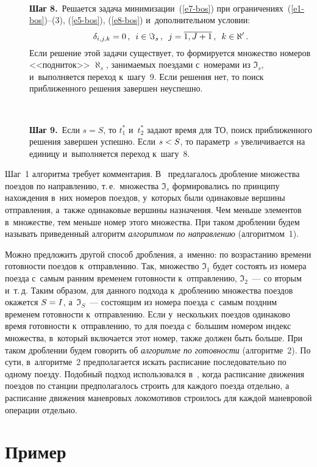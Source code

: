 \begin{multicols}{2}
\begin{description}
      
\item [\,] 
\textbf{Шаг 8.}\ Решается задача минимизации~(\ref{e7-bos}) при  
ограничениях~(\ref{e1-bos})--(3), (\ref{e5-bos}), (\ref{e8-bos}) и~дополнительном 
условии:
$$
\delta_{i,j,k}=0\,,\enskip i\in \Im_s\,,\enskip j=\overline{1,J+1}\,, \enskip k\in 
\aleph^\prime\,.
$$
Если решение этой задачи существует, то формируется множество номеров 
<<подниток>> $\aleph_s$, занимаемых поездами с~номерами из $\Im_s$, 
и~выполняется переход к~шагу~9. Если решения нет, то поиск приближенного 
решения завершен неуспешно.
\item [\,] 
\textbf{Шаг 9.}\ Если $s=S$, то $t_1^*$ и~$t_2^*$ задают время для ТО, поиск 
приближенного решения завершен успешно. Если $s\hm< S$, то параметр~$s$ 
увеличивается на единицу и~выполняется переход к~шагу~8.
\end{description}
  
  Шаг~1 алгоритма требует комментария. В~\cite{7-bos} предлагалось дробление 
множества поездов по направлению, т.\,е.\ множества $\Im_s$ формировались по 
принципу нахождения в~них номеров поездов, у~которых были одинаковые 
вершины отправления, а~также одинаковые вершины назначения. Чем меньше 
элементов в~множестве, тем меньше номер этого множества. При таком  
дроб\-ле\-нии будем называть приведенный алгоритм \textit{алгоритмом по 
направлению} (алгоритмом~1).
  
  Можно предложить другой способ дробления, а~именно: по возрастанию 
времени готовности поездов к~отправлению. Так, множество $\Im_1$ будет 
состоять из номера поезда с~самым ранним временем готовности к~отправлению, 
$\Im_2$~--- со вторым и~т.\,д. Таким образом, для данного подхода к~дроблению 
множества поездов окажется $S\hm=I$, а~$\Im_S$~--- со\-сто\-ящим из номера 
поезда с~самым поздним временем готовности к~отправлению. Если у~нескольких поездов 
одинаково время готовности к~отправлению, то для поезда с~б$\acute{\mbox{о}}$льшим номером 
индекс множества, в~который включается этот номер, также должен быть больше. 
При таком дроблении будем говорить об \textit{алгоритме по готовности} 
(алгоритме~2). По сути, в~алгоритме~2 предполагается искать расписание 
последовательно по одному поезду. Подобный подход использовался  
в~\cite{9-bos, 10-bos}, когда расписание движения поездов по станции 
предполагалось строить для каждого поезда отдельно, а расписание движения 
маневровых локомотивов строилось для каждой маневровой операции отдельно.
  
\section{Пример}


\end{multicols}

